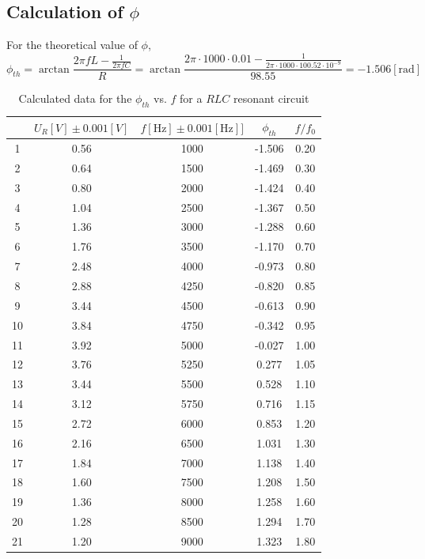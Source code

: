 \documentclass[12pt]{article}
\begin{document}
\subsection{Calculation of $\phi$}
For the theoretical value of $\phi$,
$$\phi_{th}=\arctan\frac{2\pi fL-\frac{1}{2\pi fC}}{R}=\arctan\frac{2\pi\cdot1000\cdot0.01-\frac{1}{2\pi\cdot1000\cdot100.52\cdot10^{-9}}}{98.55}=-1.506[\mathrm{rad}]$$
\begin{table}[H]
\centering
\begin{tabular}{|c|c|c|c|c|}
\hline
   &$U_R[V]\pm0.001[V]$  & $f[\mathrm{Hz}]\pm0.001[\mathrm{Hz}]]$  &$\phi_{th}$&$f/f_0$       \\ \hline
1  & 0.56      & 1000&-1.506&0.20       \\ \hline
2  & 0.64      & 1500&-1.469&0.30       \\ \hline
3  & 0.80      & 2000&-1.424&0.40       \\ \hline
4  & 1.04      & 2500&-1.367&0.50       \\ \hline
5  & 1.36      & 3000&-1.288&0.60       \\ \hline
6  & 1.76      & 3500&-1.170&0.70       \\ \hline
7  & 2.48      & 4000&-0.973&0.80       \\ \hline
8  & 2.88      & 4250&-0.820&0.85       \\ \hline
9  & 3.44      & 4500&-0.613&0.90       \\ \hline
10 & 3.84      & 4750&-0.342&0.95       \\ \hline
11 & 3.92      & 5000&-0.027&1.00       \\ \hline
12 & 3.76      & 5250& 0.277&1.05       \\ \hline
13 & 3.44      & 5500& 0.528&1.10       \\ \hline
14 & 3.12      & 5750& 0.716&1.15       \\ \hline
15 & 2.72      & 6000& 0.853&1.20       \\ \hline
16 & 2.16      & 6500& 1.031&1.30       \\ \hline
17 & 1.84      & 7000& 1.138&1.40       \\ \hline
18 & 1.60      & 7500& 1.208&1.50       \\ \hline
19 & 1.36      & 8000& 1.258&1.60       \\ \hline
20 & 1.28      & 8500& 1.294&1.70       \\ \hline
21 & 1.20      & 9000& 1.323&1.80       \\ \hline
\end{tabular}
\caption{Calculated data for the $\phi_{th}$ vs. $f$ for a $RLC$ resonant circuit}
\end{table}
\end{document}
